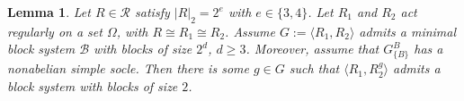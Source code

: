 \documentclass[11pt]{amsart}
\numberwithin{equation}{section}
\newtheorem{lem}[thrm]{Lemma}
\theoremstyle{definition}
\def\Z{{\mathbb Z}}
\newcommand{\sg}[1]{\langle{#1}\rangle}
\begin{document}
	\begin{lem}\label{smaller-blocks}
		Let $R\in{\mathcal R}$ satisfy $|R|_2=2^e$ with $e\in\{3,4\}$. Let $R_1$ and $R_2$ act regularly on a set $\Omega$, with $R\cong R_1\cong R_2$. Assume $G:=\sg{R_1,R_2}$ admits a 
		minimal block system $\mathcal{B}$ with blocks of size $2^d$, $d\ge 3$. Moreover, assume that $G_{\{B\}}^B$  has a nonabelian simple socle. Then there is some $g \in G$ such that $\sg{R_1, R_2^g}$ admits a block system with blocks of size $2$.
	\end{lem}
	
    
\end{document}
